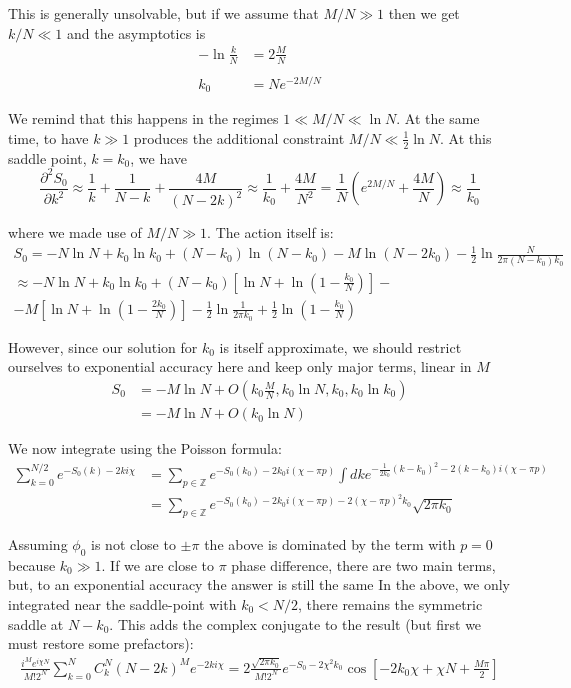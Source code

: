 This is generally unsolvable, but if we assume that $M/N\gg1$ then
we get $k/N\ll1$ and the asymptotics is
\begin{align*}
-\ln\frac{k}{N} & =2\frac{M}{N}\\
\\
k_{0} & =Ne^{-2M/N}
\end{align*}

We remind that this happens in the regimes $1\ll M/N\ll\ln N$. At
the same time, to have $k\gg1$ produces the additional constraint
$M/N\ll\frac{1}{2}\ln N$. At this saddle point, $k=k_{0}$, we have
\[
\frac{\partial^{2}S_{0}}{\partial k^{2}}\approx\frac{1}{k}+\frac{1}{N-k}+\frac{4M}{(N-2k)^{2}}\approx\frac{1}{k_{0}}+\frac{4M}{N^{2}}=\frac{1}{N}\left(e^{2M/N}+\frac{4M}{N}\right)\approx\frac{1}{k_{0}}
\]

where we made use of $M/N\gg1$. The action itself is:
\begin{multline*}
S_{0}=-N\ln N+k_{0}\ln k_{0}+(N-k_{0})\ln(N-k_{0})-M\ln(N-2k_{0})-\frac{1}{2}\ln\frac{N}{2\pi(N-k_{0})k_{0}}\\
\approx-N\ln N+k_{0}\ln k_{0}+(N-k_{0})\left[\ln N+\ln(1-\frac{k_{0}}{N})\right]-\\
-M\left[\ln N+\ln(1-\frac{2k_{0}}{N})\right]-\frac{1}{2}\ln\frac{1}{2\pi k_{0}}+\frac{1}{2}\ln(1-\frac{k_{0}}{N})
\end{multline*}



However, since our solution for $k_{0}$ is itself approximate, we
should restrict ourselves to exponential accuracy here and keep only
major terms, linear in $M$
\begin{align*}
\label{mixed_refl_action}
S_{0} & =-M\ln N+O(k_{0}\frac{M}{N},k_{0}\ln N,k_{0},k_{0}\ln k_{0})\\
& =-M\ln N+O(k_{0}\ln N)
\end{align*}

We now integrate using the Poisson formula:
\begin{align*}
\sum_{k=0}^{N/2}e^{-S_{0}(k)-2ki\chi} & =\sum_{p\in\mathbb{Z}}e^{-S_{0}(k_{0})-2k_{0}i(\chi-\pi p)}\int dke^{-\frac{1}{2k_{0}}(k-k_{0})^{2}-2(k-k_{0})i(\chi-\pi p)}\\
& =\sum_{p\in\mathbb{Z}}e^{-S_{0}(k_{0})-2k_{0}i(\chi-\pi p)-2(\chi-\pi p)^{2}k_{0}}\sqrt{2\pi k_{0}}
\end{align*}

Assuming $\phi_{0}$ is not close to $\pm\pi$ the above is dominated
by the term with $p=0$ because $k_{0}\gg1$. If we are close to $\pi$
phase difference, there are two main terms, but, to an exponential
accuracy the answer is still the same 
In the above, we only integrated near the saddle-point with $k_{0}<N/2$,
there remains the symmetric saddle at $N-k_{0}$. This adds the complex
conjugate to the result (but first we must restore some prefactors):
\begin{gather}
\frac{i^{M}e^{i\chi N}}{M!2^{N}}\sum_{k=0}^{N}C_{k}^{N}(N-2k)^{M}e^{-2ki\chi}
=
2\frac{\sqrt{2\pi k_{0}}}{M!2^{N}}
e^{-S_{0}-2\chi^{2}k_{0}}
\cos\left[-2k_{0}\chi+\chi N+\frac{M\pi}{2}\right]
\end{gather}

